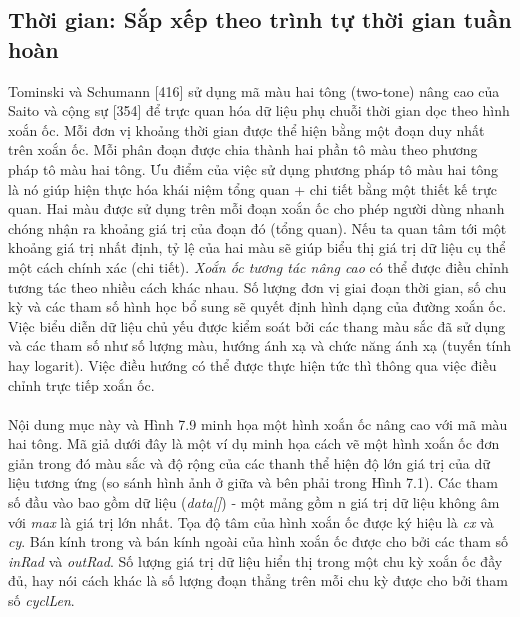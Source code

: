 \subsection{Thời gian: Sắp xếp theo trình tự thời gian tuần hoàn}
Tominski và Schumann [416] sử dụng mã màu hai tông (two-tone) nâng cao của Saito và cộng sự [354] để trực quan hóa dữ liệu phụ chuỗi thời gian dọc theo hình xoắn ốc. Mỗi đơn vị khoảng thời gian được thể hiện bằng một đoạn duy nhất trên xoắn ốc. Mỗi phân đoạn được chia thành hai phần tô màu theo phương pháp tô màu hai tông. Ưu điểm của việc sử dụng phương pháp tô màu hai tông là nó giúp hiện thực hóa khái niệm tổng quan + chi tiết bằng một thiết kế trực quan. Hai màu được sử dụng trên mỗi đoạn xoắn ốc cho phép người dùng nhanh chóng nhận ra khoảng giá trị của đoạn đó (tổng quan). Nếu ta quan tâm tới một khoảng giá trị nhất định, tỷ lệ của hai màu sẽ giúp biểu thị giá trị dữ liệu cụ thể một cách chính xác (chi tiết). \textit{Xoắn ốc tương tác nâng cao} có thể được điều chỉnh tương tác theo nhiều cách khác nhau. Số lượng đơn vị giai đoạn thời gian, số chu kỳ và các tham số hình học bổ sung sẽ quyết định hình dạng của đường xoắn ốc. Việc biểu diễn dữ liệu chủ yếu được kiểm soát bởi các thang màu sắc đã sử dụng và các tham số như số lượng màu, hướng ánh xạ và chức năng ánh xạ (tuyến tính hay logarit). Việc điều hướng có thể được thực hiện tức thì thông qua việc điều chỉnh trực tiếp xoắn ốc.
\\ \\ 
Nội dung mục này và Hình 7.9 minh họa một hình xoắn ốc nâng cao với mã màu hai tông. Mã giả dưới đây là một ví dụ minh họa cách vẽ một hình xoắn ốc đơn giản trong đó màu sắc và độ rộng của các thanh thể hiện độ lớn giá trị của dữ liệu tương ứng (so sánh hình ảnh ở giữa và bên phải trong Hình 7.1). Các tham số đầu vào bao gồm dữ liệu (\textit{data[]}) - một mảng gồm n giá trị dữ liệu không âm với \textit{max} là giá trị lớn nhất. Tọa độ tâm của hình xoắn ốc được ký hiệu là \textit{cx} và \textit{cy}. Bán kính trong và bán kính ngoài của hình xoắn ốc được cho bởi các tham số \textit{inRad} và \textit{outRad}. Số lượng giá trị dữ liệu hiển thị trong một chu kỳ xoắn ốc đầy đủ, hay nói cách khác là số lượng đoạn thẳng trên mỗi chu kỳ được cho bởi tham số \textit{cyclLen}.
